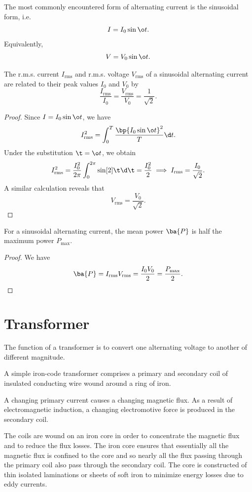 The most commonly encountered form of alternating current is the sinusoidal form, i.e. \[I = I_0 \sin \o t.\] Equivalently, \[V = V_0 \sin \o t.\]

\begin{proposition}
    The r.m.s. current $I_{\text{rms}}$ and r.m.s. voltage $V_{\text{rms}}$ of a sinusoidal alternating current are related to their peak values $I_0$ and $V_0$ by \[\frac{I_{\text{rms}}}{I_0} = \frac{V_{\text{rms}}}{V_0} = \frac1{\sqrt2}.\]
\end{proposition}
\begin{proof}
    Since $I = I_0 \sin \o t$, we have \[I_{\text{rms}}^2 = \int_0^T \frac{\bp{I_0 \sin \o t}^2}{T} \d t.\] Under the substitution $\t = \o t$, we obtain \[I_{\text{rms}}^2 = \frac{I_0^2}{2\pi} \int_0^{2\pi} \sin[2] \t \d \t = \frac{I_0^2}{2} \implies I_{\text{rms}} = \frac{I_0}{\sqrt2}.\] A similar calculation reveals that \[V_{\text{rms}} = \frac{V_0}{\sqrt2}.\]
\end{proof}

\begin{proposition}
    For a sinusoidal alternating current, the mean power $\ba{P}$ is half the maximum power $P_{\text{max}}$.
\end{proposition}
\begin{proof}
    We have \[\ba{P} = I_{\text{rms}} V_{\text{rms}} = \frac{I_0 V_0}{2} = \frac{P_{\text{max}}}{2}.\]
\end{proof}

\section{Transformer}

The function of a transformer is to convert one alternating voltage to another of different magnitude.

A simple iron-code transformer comprises a primary and secondary coil of insulated conducting wire wound around a ring of iron.

A changing primary current causes a changing magnetic flux. As a result of electromagnetic induction, a changing electromotive force is produced in the secondary coil.

The coils are wound on an iron core in order to concentrate the magnetic flux and to reduce the flux losses. The iron core ensures that essentially all the magnetic flux is confined to the core and so nearly all the flux passing through the primary coil also pass through the secondary coil. The core is constructed of thin isolated laminations or sheets of soft iron to minimize energy losses due to eddy currents.

